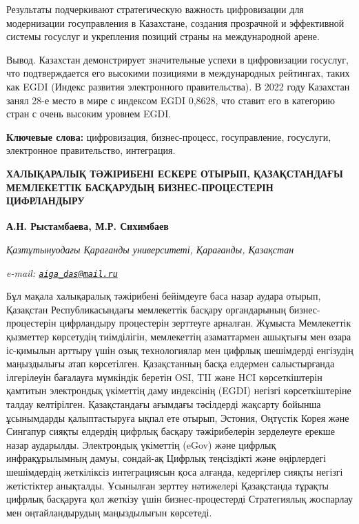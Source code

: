 Результаты подчеркивают стратегическую важность цифровизации для
модернизации госуправления в Казахстане, создания прозрачной и
эффективной системы госуслуг и укрепления позиций страны на
международной арене.

Вывод. Казахстан демонстрирует значительные успехи в цифровизации
госуслуг, что подтверждается его высокими позициями в международных
рейтингах, таких как EGDI (Индекс развития электронного правительства).
В 2022 году Казахстан занял 28-е место в мире с индексом EGDI 0,8628,
что ставит его в категорию стран с очень высоким уровнем EGDI.

{\bfseries Ключевые слова:} цифровизация, бизнес-процесс, госуправление,
госуслуги, электронное правительство, интеграция.

\begin{articleheader}
{\bfseries ХАЛЫҚАРАЛЫҚ ТӘЖІРИБЕНІ ЕСКЕРЕ ОТЫРЫП, ҚАЗАҚСТАНДАҒЫ МЕМЛЕКЕТТІК БАСҚАРУДЫҢ БИЗНЕС-ПРОЦЕСТЕРІН ЦИФРЛАНДЫРУ}

{\bfseries  
А.Н. Рыстамбаева\textsuperscript{\envelope },  
М.Р. Сихимбаев}
\end{articleheader}

\begin{affiliation}
\emph{Қазтұтынуодағы Қарағанды университеті, Қарағанды, Қазақстан}

\emph{e-mail: \href{mailto:aiga_das@mail.ru}{\nolinkurl{aiga\_das@mail.ru}}}
\end{affiliation}

Бұл мақала халықаралық тәжірибені бейімдеуге баса назар аудара отырып,
Қазақстан Республикасындағы мемлекеттік басқару органдарының
бизнес-процестерін цифрландыру процестерін зерттеуге арналған. Жұмыста
Мемлекеттік қызметтер көрсетудің тиімділігін, мемлекеттің азаматтармен
ашықтығы мен өзара іс-қимылын арттыру үшін озық технологиялар мен
цифрлық шешімдерді енгізудің маңыздылығы атап көрсетілген. Қазақстанның
басқа елдермен салыстырғанда ілгерілеуін бағалауға мүмкіндік беретін
OSI, TII және HCI көрсеткіштерін қамтитын электрондық үкіметтің даму
индексінің (EGDI) негізгі көрсеткіштеріне талдау келтірілген.
Қазақстандағы ағымдағы тәсілдерді жақсарту бойынша ұсынымдарды
қалыптастыруға ықпал ете отырып, Эстония, Оңтүстік Корея және Сингапур
сияқты елдердің цифрлық басқару тәжірибелерін зерделеуге ерекше назар
аударылды. Электрондық үкіметтің (eGov) және цифрлық инфрақұрылымның
дамуы, сондай-ақ Цифрлық теңсіздікті және өңірлердегі шешімдердің
жеткіліксіз интеграциясын қоса алғанда, кедергілер сияқты негізгі
жетістіктер анықталды. Ұсынылған зерттеу нәтижелері Қазақстанда тұрақты
цифрлық басқаруға қол жеткізу үшін бизнес-процестерді Стратегиялық
жоспарлау мен оңтайландырудың маңыздылығын көрсетеді.

